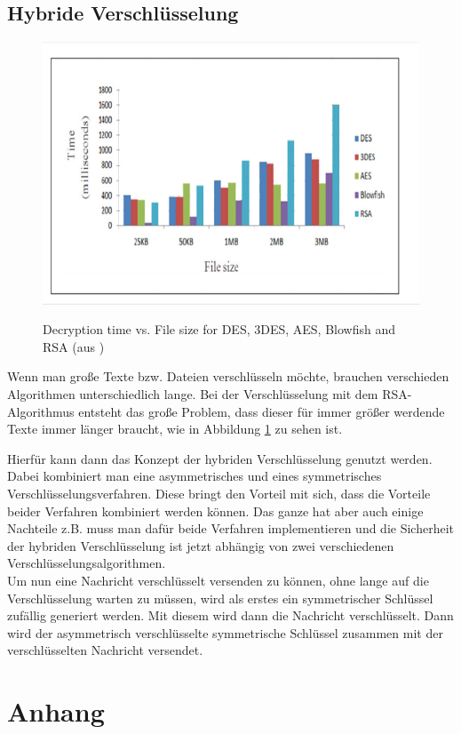\documentclass[12pt,a4paper]{scrartcl}
\begin{document}
	\subsection{Hybride Verschlüsselung}
		\label{cha:hybrid}
		\begin{figure}
		
\includegraphics[scale=0.45]{rsa_time} \\
\caption{Decryption time vs. File size for DES, 3DES, AES, Blowfish and RSA (aus \cite{rsatime})}
\label{fig:figure5}
\end{figure}
		
		Wenn man große Texte bzw. Dateien verschlüsseln möchte, brauchen verschieden Algorithmen unterschiedlich lange. Bei der Verschlüsselung mit dem RSA-Algorithmus entsteht das große Problem, dass dieser für immer größer  werdende Texte immer länger braucht, wie in Abbildung \ref{fig:figure5} zu sehen ist. 

		Hierfür kann dann das Konzept der hybriden Verschlüsselung genutzt werden. Dabei kombiniert man eine asymmetrisches und eines symmetrisches Verschlüsselungsverfahren. Diese bringt den Vorteil mit sich, dass die Vorteile  beider Verfahren kombiniert werden können. Das ganze hat aber auch einige Nachteile z.B. muss man dafür beide Verfahren implementieren und die Sicherheit der hybriden Verschlüsselung ist jetzt abhängig von zwei verschiedenen Verschlüsselungsalgorithmen. \\
		Um nun eine Nachricht verschlüsselt versenden zu können, ohne lange auf die Verschlüsselung warten zu müssen, wird als erstes ein symmetrischer Schlüssel zufällig generiert werden. Mit diesem wird dann die Nachricht verschlüsselt. Dann wird der asymmetrisch verschlüsselte symmetrische Schlüssel zusammen mit der verschlüsselten Nachricht versendet.


\pagebreak
\section{Anhang}

\listoffigures
\pagebreak

\nocite{*}
\printbibliography
\end{document}
